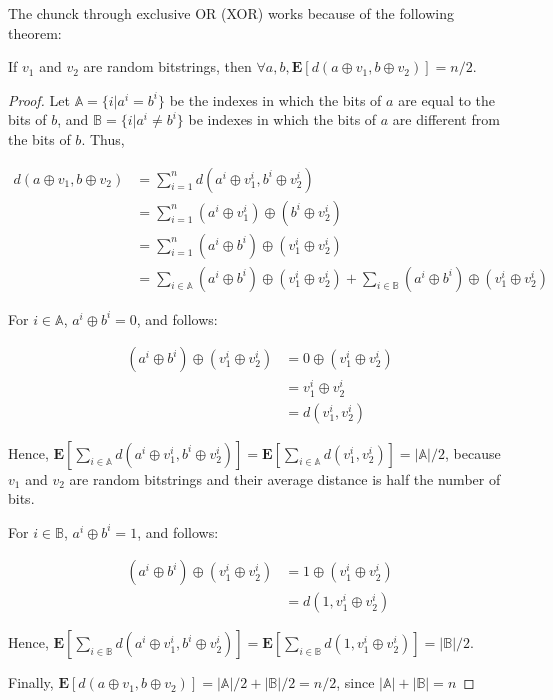 The chunck through exclusive OR (XOR) works because of the following theorem:

\begin{theorem}
If $v_1$ and $v_2$ are random bitstrings, then $\forall a, b, \mathbf{E} \left[ d(a \oplus v_1, b \oplus v_2) \right] = n/2$.
\end{theorem}
\begin{proof}
Let $\mathbb{A} = \{ i | a^i = b^i \}$ be the indexes in which the bits of $a$ are equal to the bits of $b$, and $\mathbb{B} = \{ i | a^i \ne b^i \}$ be indexes in which the bits of $a$ are different from the bits of $b$. Thus,

\begin{align*}
d(a \oplus v_1, b \oplus v_2) &= \sum_{i=1}^n d(a^i \oplus v_1^i, b^i \oplus v_2^i) \\
    &= \sum_{i=1}^n (a^i \oplus v_1^i) \oplus (b^i \oplus v_2^i) \\
    &= \sum_{i=1}^n (a^i \oplus b^i) \oplus (v_1^i \oplus v_2^i) \\
    &= \sum_{i \in \mathbb{A}} (a^i \oplus b^i) \oplus (v_1^i \oplus v_2^i) +
       \sum_{i \in \mathbb{B}} (a^i \oplus b^i) \oplus (v_1^i \oplus v_2^i)
\end{align*}

For $i \in \mathbb{A}$, $a^i \oplus b^i = 0$, and follows:

\begin{align*}
(a^i \oplus b^i) \oplus (v_1^i \oplus v_2^i) &= 0 \oplus (v_1^i \oplus v_2^i) \\
    &= v_1^i \oplus v_2^i \\
    &= d(v_1^i, v_2^i)
\end{align*}

Hence, $\mathbf{E} \left[ \sum_{i \in \mathbb{A}} d(a^i \oplus v_1^i, b^i \oplus v_2^i) \right] = \mathbf{E} \left[ \sum_{i \in \mathbb{A}} d(v_1^i, v_2^i) \right] = |\mathbb{A}|/2$, because $v_1$ and $v_2$ are random bitstrings and their average distance is half the number of bits.

For $i \in \mathbb{B}$, $a^i \oplus b^i = 1$, and follows:

\begin{align*}
(a^i \oplus b^i) \oplus (v_1^i \oplus v_2^i) &= 1 \oplus (v_1^i \oplus v_2^i) \\
    &= d(1, v_1^i \oplus v_2^i)
\end{align*}

Hence, $\mathbf{E} \left[ \sum_{i \in \mathbb{B}} d(a^i \oplus v_1^i, b^i \oplus v_2^i) \right] = \mathbf{E} \left[ \sum_{i \in \mathbb{B}} d(1, v_1^i \oplus v_2^i) \right] = |\mathbb{B}|/2$.

Finally, $\mathbf{E} \left[ d(a \oplus v_1, b \oplus v_2) \right] = |\mathbb{A}|/2 + |\mathbb{B}|/2 = n/2$, since $|\mathbb{A}| + |\mathbb{B}| = n$
\end{proof}

